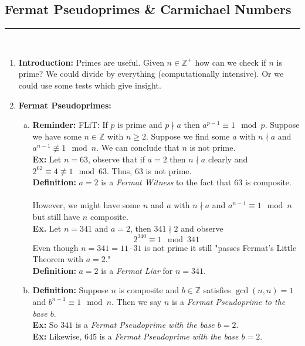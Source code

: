 \documentclass[class=article, crop=false]{standalone}
\def\integers{{\mathbb Z}}
\begin{document}
\subsection{Fermat Pseudoprimes \& Carmichael Numbers}
\rule{\textwidth}{1pt}\\
\begin{enumerate}[1.]
	\item \textbf{Introduction:}
	Primes are useful. Given $n\in\integers^+$ how can we check if $n$ is prime?
	We could divide by everything (computationally intensive).
	Or we could use some tests which give insight.
	
	\item \textbf{Fermat Pseudoprimes:}
		\begin{enumerate}[(a)]
			\item \textbf{Reminder:}
				FLiT: If $p$ is prime and $p\nmid a$ then $a^{p-1}\equiv 1\mod p$.
				Suppose we have some $n\in\integers$ with $n\geq 2$. Suppose we find
				some $a$ with $n\nmid a$ and $a^{n-1}\not\equiv 1\mod n$. We can
				conclude that $n$ is not prime.\\
				\textbf{Ex:}
				Let $n=63$, observe that if $a=2$ then $n\nmid a$ clearly and
				$2^{62}\equiv 4\not\equiv 1\mod 63$. Thus, $63$ is not prime.\\
				\textbf{Definition:} $a=2$ is a \emph{Fermat Witness} to the fact that
				$63$ is composite.\\\\
				However, we might have some $n$ and $a$ with $n\nmid a$ and $a^{n-1}\equiv 1\mod n$
				but still have $n$ composite.\\
				\textbf{Ex.} Let $n=341$ and $a=2$, then $341\nmid 2$ and observe
				$$2^{340} \equiv 1\mod 341$$
				Even though $n=341=11\cdot 31$ is not prime it still "passes Fermat's
				Little Theorem with $a=2$."\\
				\textbf{Definition:} $a=2$ is a \emph{Fermat Liar} for $n=341$.

			\item \textbf{Definition:} 
				Suppose $n$ is composite and $b\in\integers$ satisfies
				$\gcd(n,n)=1$ and $b^{n-1}\equiv 1\mod n$. 
				Then we say $n$ is a \emph{Fermat Pseudoprime to the base $b$}.\\
				\textbf{Ex:} So $341$ is a \emph{Fermat Pseudoprime with the base $b=2$}.\\
				\textbf{Ex:} Likewise, $645$ is a \emph{Fermat Pseudoprime with the base $b=2$}.
		\end{enumerate}
	

\end{enumerate}
\end{document}
